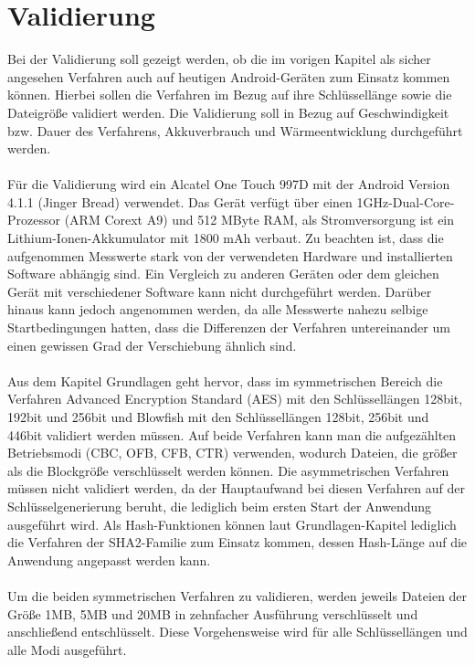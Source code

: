 \documentclass[10pt, a4paper,headsepline,pointednumbers]{scrreprt}
\begin{document}
\chapter{Validierung}
Bei der Validierung soll gezeigt werden, ob die im vorigen Kapitel als sicher angesehen Verfahren auch auf heutigen Android-Geräten zum Einsatz kommen können. Hierbei sollen die Verfahren im Bezug auf ihre Schlüssellänge sowie die Dateigröße validiert werden. Die Validierung soll in Bezug auf Geschwindigkeit bzw. Dauer des Verfahrens, Akkuverbrauch und Wärmeentwicklung durchgeführt werden.  \\ \\
Für die Validierung wird ein Alcatel One Touch 997D mit der Android Version 4.1.1 (Jinger Bread) verwendet. Das Gerät verfügt über einen 1GHz-Dual-Core-Prozessor (ARM Corext A9) und 512 MByte RAM, als Stromversorgung ist ein Lithium-Ionen-Akkumulator mit 1800 mAh verbaut. Zu  beachten ist, dass die aufgenommen Messwerte stark von der verwendeten Hardware und installierten Software abhängig sind. Ein Vergleich zu anderen Geräten oder dem gleichen Gerät mit verschiedener Software kann nicht durchgeführt werden. Darüber hinaus kann jedoch angenommen werden, da alle Messwerte nahezu selbige Startbedingungen hatten, dass die Differenzen der Verfahren untereinander um einen gewissen Grad der Verschiebung ähnlich sind.\\ \\
Aus dem Kapitel Grundlagen geht hervor, dass im symmetrischen Bereich die Verfahren Advanced Encryption Standard (AES) mit den Schlüssellängen 128bit, 192bit und 256bit und Blowfish mit den Schlüssellängen 128bit, 256bit und 446bit validiert werden müssen. Auf beide Verfahren kann man die aufgezählten Betriebsmodi (CBC, OFB, CFB, CTR) verwenden, wodurch Dateien, die größer als die Blockgröße verschlüsselt werden können. Die asymmetrischen Verfahren müssen nicht validiert werden, da der Hauptaufwand bei diesen Verfahren auf der Schlüsselgenerierung beruht, die lediglich beim ersten Start der Anwendung ausgeführt wird. Als Hash-Funktionen können laut Grundlagen-Kapitel lediglich die Verfahren der SHA2-Familie zum Einsatz kommen, dessen Hash-Länge auf die Anwendung angepasst werden kann. \\ \\
Um die beiden symmetrischen Verfahren zu validieren, werden jeweils Dateien der Größe 1MB, 5MB und 20MB in zehnfacher Ausführung verschlüsselt und anschließend entschlüsselt. Diese Vorgehensweise wird für alle Schlüssellängen und alle Modi ausgeführt. \\
\end{document}
